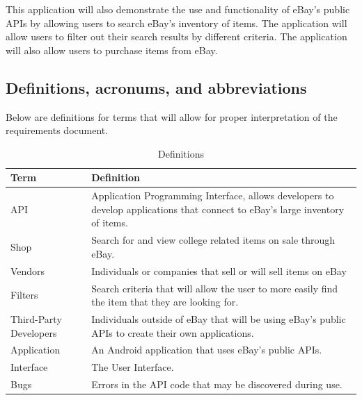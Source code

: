 \documentclass[journal,compsoc, 10pt, draftclsnofoot, onecolumn]{IEEEtran}
\begin{document}
This application will also demonstrate the use and functionality of eBay's 
public APIs by allowing users to search eBay's inventory of items. The 
application will allow users to filter out their search results by different 
criteria. The application will also allow users to purchase items from eBay. 

\subsection{Definitions, acronums, and abbreviations}

Below are definitions for terms that will allow for proper interpretation of the
 requirements document.

\begin{table}[]
\centering
\caption{Definitions}
\label{my-label}
\begin{tabularx}{\textwidth}{X|X}
\hline
\textbf{Term}               & \textbf{Definition}                                                                                                           \\ \hline
API                    	      & Application Programming Interface, allows developers to develop applications that connect to eBay's large inventory of items. \\ \hline
Shop                   	      & Search for and view college related items on sale through eBay.                                                               \\ \hline
Vendors               	      & Individuals or companies that sell or will sell items on eBay                                                                 \\ \hline
Filters                	      & Search criteria that will allow the user to more easily find the item that they are looking for.                              \\ \hline
Third-Party Developers & Individuals outside of eBay that will be using eBay's public APIs to create their own applications.                           \\ \hline
Application            	      & An Android application that uses eBay's public APIs.                                                                          \\ \hline
Interface              	      & The User Interface.                                                                                                           \\ \hline
Bugs                   	      & Errors in the API code that may be discovered during use.                                                                     \\ \hline

\end{tabularx}
\end{table}
\end{document}
